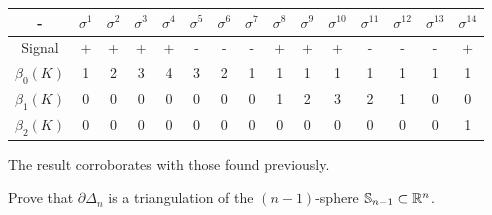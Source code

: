 \begin{enumerate}
    \begin{center}
        \begin{tabular}{ c|c|c|c|c|c|c|c|c|c|c|c|c|c|c}
         - & $\sigma^1$ & $\sigma^2$ & $\sigma^3$ & $\sigma^4$ & $\sigma^5$ &
         $\sigma^6$ & $\sigma^7$ &$\sigma^8$ &$\sigma^9$ &$\sigma^{10}$
         &$\sigma^{11}$ &$\sigma^{12}$ &$\sigma^{13}$ &$\sigma^{14}$ \\ 
         \hline
         Signal & + & + & + & + & - & - & - & + & + & + & - & - & - & + \\  
         $\beta_0(K)$ & 1 & 2 & 3 & 4 & 3 & 2 & 1 & 1 & 1 & 1 & 1 & 1 & 1 & 1\\ 
         $\beta_1(K)$ & 0 & 0 & 0 & 0 & 0 & 0 & 0 & 1 & 2 & 3 & 2 & 1 & 0 & 0 \\     
         $\beta_2(K)$ & 0 & 0 & 0 & 0 & 0 & 0 & 0 & 0 & 0 & 0 & 0 & 0 & 0 & 1\\     

        \end{tabular}
    \end{center}

\end{enumerate}

The result corroborates with those found previously. 

\noindent\linia

\begin{exercise}
    Prove that $\partial \Delta_n$ is a triangulation of the $(n -1)$-sphere
    $\mathbb{S}_{n-1} \subset \mathbb{R}^n$. 
\end{exercise}

